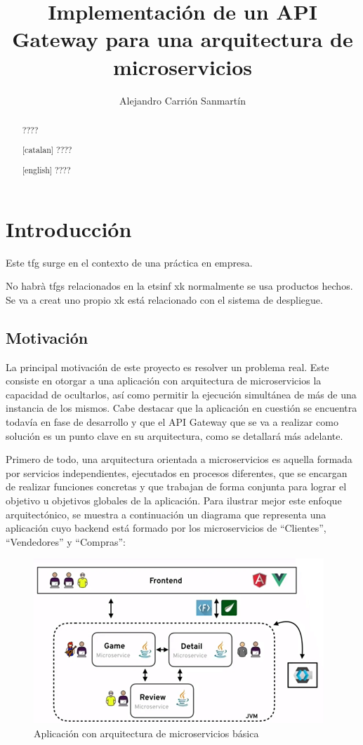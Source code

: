 \documentclass[11pt,spanish,listoffigures]{tfgetsinf}
\title{Implementación de un API Gateway para una arquitectura de microservicios}
\author{Alejandro Carrión Sanmartín}
\begin{document}

\begin{abstract}
????
\end{abstract}
\begin{abstract}[catalan]
????
\end{abstract}
\begin{abstract}[english]
????
\end{abstract}

\mainmatter


\chapter{Introducción}

Este tfg surge en el contexto de una práctica en empresa.

No habrà tfgs relacionados en la etsinf xk normalmente se usa productos hechos. Se va a creat uno propio xk está relacionado con el sistema de despliegue.

\section{Motivación}

La principal motivación de este proyecto es resolver un problema real. Este consiste en otorgar a una aplicación con arquitectura de microservicios la capacidad de ocultarlos, así como permitir la ejecución simultánea de más de una instancia de los mismos. Cabe destacar que la aplicación en cuestión se encuentra todavía en fase de desarrollo y que el API Gateway que se va a realizar como solución es un punto clave en su arquitectura, como se detallará más adelante.

Primero de todo, una arquitectura orientada a microservicios es aquella formada por servicios independientes, ejecutados en procesos diferentes, que se encargan de realizar funciones concretas y que trabajan de forma conjunta para lograr el objetivo u objetivos globales de la aplicación. Para ilustrar mejor este enfoque arquitectónico, se muestra a continuación un diagrama que representa una aplicación cuyo backend está formado por los microservicios de “Clientes”, “Vendedores” y “Compras”:

\begin{figure}
	\centering
	\includegraphics{images/a}
	\caption{Aplicación con arquitectura de microservicios básica}
\end{figure}
\end{document}
